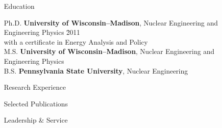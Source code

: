 \documentclass{resume3} %
\begin{document}

\begin{rSection}{Education}

\begin{tabbing}
Ph.D. \hspace*{1 em}\= \textbf{University of Wisconsin--Madison}, Nuclear Engineering and Engineering Physics \hspace*{1em} \= 2011 \\
      \> with a certificate in Energy Analysis and Policy \\
%
M.S. \hspace*{1 em}\> \textbf{University of Wisconsin--Madison}, Nuclear Engineering and Engineering Physics   \\
%
B.S. \hspace*{1 em}\> \textbf{Pennsylvania State University}, Nuclear Engineering  
\end{tabbing}
\end{rSection}

\begin{rSection}{Research Experience}

\end{rSection}

\begin{rSection}{Selected Publications}
%

\end{rSection}

\vspace*{0.5em}
\begin{rSection}{Leadership \& Service}

\end{rSection}
\end{document}
